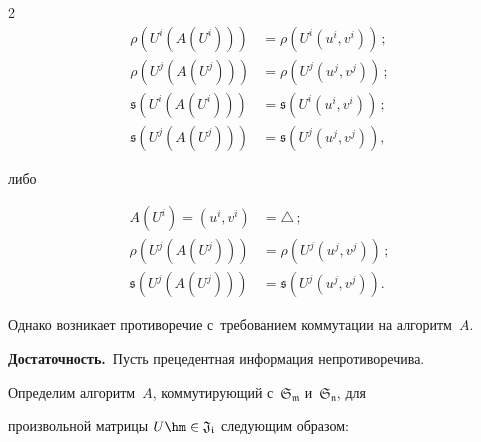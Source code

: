 \begin{multicols}{2}
\begin{align*}


 \rho\left(U^i\left(A\left(U^i\right)\right)\right)&=\rho\left(U^i\left(u^i, v^i\right)\right)\,; \\


    \rho\left(U^j\left(A\left(U^j\right)\right)\right)&=\rho\left(U^j\left(u^j, v^j\right)\right)\,;\\ 


    \mathfrak{s}\left(U^i\left(A\left(U^i\right)\right)\right)&=  \mathfrak{s}


    \left(U^i\left(u^i, v^i\right)\right)\,;\\ 


    \mathfrak{s}\left(U^j\left(A\left(U^j\right)\right)\right)&=\mathfrak{s}\left(U^j\left(u^j, v^j\right)\right),


\end{align*}


 либо


 


\noindent


\begin{align*}


A\left(U^i\right)= \left(u^{i},v^{i}\right)&=\triangle\,;\\


\rho\left(U^j\left(A\left(U^j\right)\right)\right)&=\rho\left(U^j\left(u^j, v^j\right)\right)\,;\\ 


\mathfrak{s}\left(U^j\left(A\left(U^j\right)\right)\right)&=\mathfrak{s}\left(U^j\left(u^j, v^j\right)\right).


\end{align*}


 Однако возникает противоречие с~требованием коммутации на алгоритм~$A$.








\smallskip





\noindent


\textbf{Достаточность.}\ Пусть прецедентная информация непротиворечива.





Определим алгоритм~$A$, коммутирующий с~$\mathfrak{S_m}$ и~$\mathfrak{S_n}$, для 


произвольной матрицы $U \hm\in \mathfrak{J_i}$ сле\-ду\-ющим образом:






\end{multicols}
